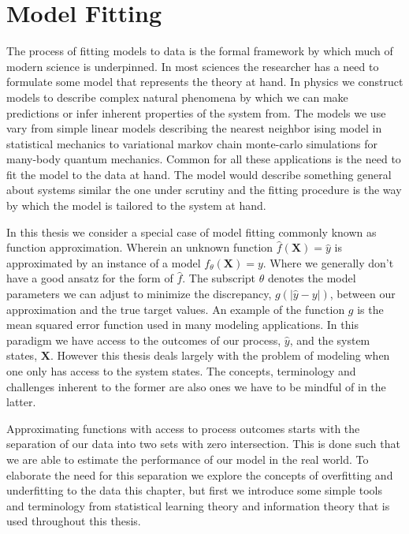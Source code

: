 \section{Model Fitting}\label{sec:models}

The process of fitting models to data is the formal framework by which much of modern science is underpinned. In most sciences the researcher has a need to formulate some model that represents the theory at hand. In physics we construct models to describe complex natural phenomena by which we can make predictions or infer inherent properties of the system from. The models we use vary from simple linear models describing the nearest neighbor ising model in statistical mechanics to variational markov chain monte-carlo simulations for many-body quantum mechanics. Common for all these applications is the need to fit the model to the data at hand. The model would describe something general about systems similar the one under scrutiny and the fitting procedure is the way by which the model is tailored to the system at hand. 

In this thesis we consider a special case of model fitting commonly known as function approximation. Wherein an unknown function $\hat{f}(\mathbf{X}) = \hat{y}$ is approximated by an instance of a model $f_\theta(\mathbf{X}) = y$. Where we generally don't have a good ansatz for the form of $\hat{f}$. The subscript $\theta$ denotes the model parameters we can adjust to minimize the discrepancy, $g(|\hat{y} - y|)$, between our approximation and the true target values. An  example of the function $g$ is the mean squared error function used in many modeling applications. In this paradigm we have access to the outcomes of our process, $\hat{y}$, and the system states, $\mathbf{X}$. However this thesis deals largely with the problem of modeling when one only has access to the system states. The concepts, terminology and challenges inherent to the former are also ones we have to be mindful of in the latter.

Approximating functions with access to process outcomes starts with the separation of our data into two sets with zero intersection. This is done such that we are able to estimate the performance of our model in the real world. To elaborate the need for this separation we explore the concepts of overfitting and underfitting to the data this chapter, but first we introduce some simple tools and terminology from statistical learning theory and information theory that is used throughout this thesis.


